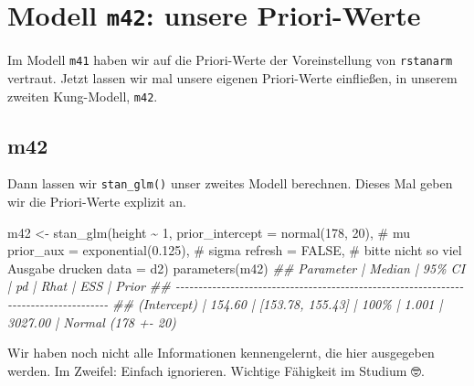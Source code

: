 \documentclass[
  a4paper,
  DIV=11]{scrreprt}
\newenvironment{Shaded}{\begin{snugshade}}{\end{snugshade}}
\newcommand{\AttributeTok}[1]{\textcolor[rgb]{0.40,0.45,0.13}{#1}}
\newcommand{\CommentTok}[1]{\textcolor[rgb]{0.37,0.37,0.37}{#1}}
\newcommand{\ConstantTok}[1]{\textcolor[rgb]{0.56,0.35,0.01}{#1}}
\newcommand{\DecValTok}[1]{\textcolor[rgb]{0.68,0.00,0.00}{#1}}
\newcommand{\DocumentationTok}[1]{\textcolor[rgb]{0.37,0.37,0.37}{\textit{#1}}}
\newcommand{\FloatTok}[1]{\textcolor[rgb]{0.68,0.00,0.00}{#1}}
\newcommand{\FunctionTok}[1]{\textcolor[rgb]{0.28,0.35,0.67}{#1}}
\newcommand{\NormalTok}[1]{\textcolor[rgb]{0.00,0.23,0.31}{#1}}
\newcommand{\OtherTok}[1]{\textcolor[rgb]{0.00,0.23,0.31}{#1}}
\newcommand{\SpecialCharTok}[1]{\textcolor[rgb]{0.37,0.37,0.37}{#1}}
\theoremstyle{definition}
\theoremstyle{remark}
\begin{document}
\hypertarget{modell-m42-unsere-priori-werte}{%
\section{\texorpdfstring{Modell \texttt{m42}: unsere
Priori-Werte}{Modell m42: unsere Priori-Werte}}\label{modell-m42-unsere-priori-werte}}

Im Modell \texttt{m41} haben wir auf die Priori-Werte der Voreinstellung
von \texttt{rstanarm} vertraut. Jetzt lassen wir mal unsere eigenen
Priori-Werte einfließen, in unserem zweiten Kung-Modell, \texttt{m42}.

\hypertarget{m42}{%
\subsection{m42}\label{m42}}

Dann lassen wir \texttt{stan\_glm()} unser zweites Modell berechnen.
Dieses Mal geben wir die Priori-Werte explizit an.

\begin{Shaded}
\begin{Highlighting}[]
\NormalTok{m42 }\OtherTok{\textless{}{-}} 
  \FunctionTok{stan\_glm}\NormalTok{(height }\SpecialCharTok{\textasciitilde{}} \DecValTok{1}\NormalTok{, }
           \AttributeTok{prior\_intercept =} \FunctionTok{normal}\NormalTok{(}\DecValTok{178}\NormalTok{, }\DecValTok{20}\NormalTok{),  }\CommentTok{\# mu}
           \AttributeTok{prior\_aux =} \FunctionTok{exponential}\NormalTok{(}\FloatTok{0.125}\NormalTok{),  }\CommentTok{\# sigma}
           \AttributeTok{refresh =} \ConstantTok{FALSE}\NormalTok{,  }\CommentTok{\# bitte nicht so viel Ausgabe drucken}
           \AttributeTok{data =}\NormalTok{ d2)}
\FunctionTok{parameters}\NormalTok{(m42)}
\DocumentationTok{\#\# Parameter   | Median |           95\% CI |   pd |  Rhat |     ESS |              Prior}
\DocumentationTok{\#\# {-}{-}{-}{-}{-}{-}{-}{-}{-}{-}{-}{-}{-}{-}{-}{-}{-}{-}{-}{-}{-}{-}{-}{-}{-}{-}{-}{-}{-}{-}{-}{-}{-}{-}{-}{-}{-}{-}{-}{-}{-}{-}{-}{-}{-}{-}{-}{-}{-}{-}{-}{-}{-}{-}{-}{-}{-}{-}{-}{-}{-}{-}{-}{-}{-}{-}{-}{-}{-}{-}{-}{-}{-}{-}{-}{-}{-}{-}{-}{-}{-}{-}{-}{-}{-}}
\DocumentationTok{\#\# (Intercept) | 154.60 | [153.78, 155.43] | 100\% | 1.001 | 3027.00 | Normal (178 +{-} 20)}
\end{Highlighting}
\end{Shaded}

Wir haben noch nicht alle Informationen kennengelernt, die hier
ausgegeben werden. Im Zweifel: Einfach ignorieren. Wichtige Fähigkeit im
Studium 🤓.
\end{document}
